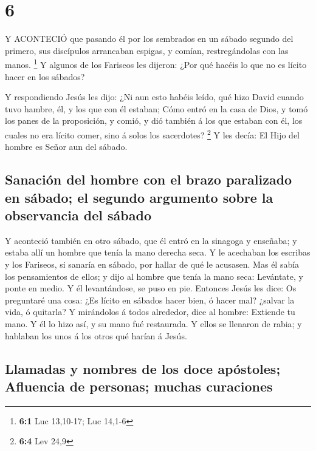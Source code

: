 \hypertarget{section-5}{%
\section{6}\label{section-5}}

 Y ACONTECIÓ que pasando él por los sembrados en un sábado
segundo del primero, sus discípulos arrancaban espigas, y comían,
restregándolas con las manos. \footnote{\textbf{6:1} Luc 13,10-17; Luc
  14,1-6}  Y algunos de los Fariseos les dijeron: ¿Por qué
hacéis lo que no es lícito hacer en los sábados?

 Y respondiendo Jesús les dijo: ¿Ni aun esto habéis leído,
qué hizo David cuando tuvo hambre, él, y los que con él estaban;
 Cómo entró en la casa de Dios, y tomó los panes de la
proposición, y comió, y dió también á los que estaban con él, los cuales
no era lícito comer, sino á solos los sacerdotes? \footnote{\textbf{6:4}
  Lev 24,9}  Y les decía: El Hijo del hombre es Señor aun
del sábado.

\hypertarget{sanaciuxf3n-del-hombre-con-el-brazo-paralizado-en-suxe1bado-el-segundo-argumento-sobre-la-observancia-del-suxe1bado}{%
\subsection{Sanación del hombre con el brazo paralizado en sábado; el
segundo argumento sobre la observancia del
sábado}\label{sanaciuxf3n-del-hombre-con-el-brazo-paralizado-en-suxe1bado-el-segundo-argumento-sobre-la-observancia-del-suxe1bado}}

 Y aconteció también en otro sábado, que él entró en la
sinagoga y enseñaba; y estaba allí un hombre que tenía la mano derecha
seca.  Y le acechaban los escribas y los Fariseos, si
sanaría en sábado, por hallar de qué le acusasen.  Mas él
sabía los pensamientos de ellos; y dijo al hombre que tenía la mano
seca: Levántate, y ponte en medio. Y él levantándose, se puso en pie.
 Entonces Jesús les dice: Os preguntaré una cosa: ¿Es lícito
en sábados hacer bien, ó hacer mal? ¿salvar la vida, ó quitarla?
 Y mirándolos á todos alrededor, dice al hombre: Extiende
tu mano. Y él lo hizo así, y su mano fué restaurada.  Y
ellos se llenaron de rabia; y hablaban los unos á los otros qué harían á
Jesús.

\hypertarget{llamadas-y-nombres-de-los-doce-apuxf3stoles-afluencia-de-personas-muchas-curaciones}{%
\subsection{Llamadas y nombres de los doce apóstoles; Afluencia de
personas; muchas
curaciones}\label{llamadas-y-nombres-de-los-doce-apuxf3stoles-afluencia-de-personas-muchas-curaciones}}

